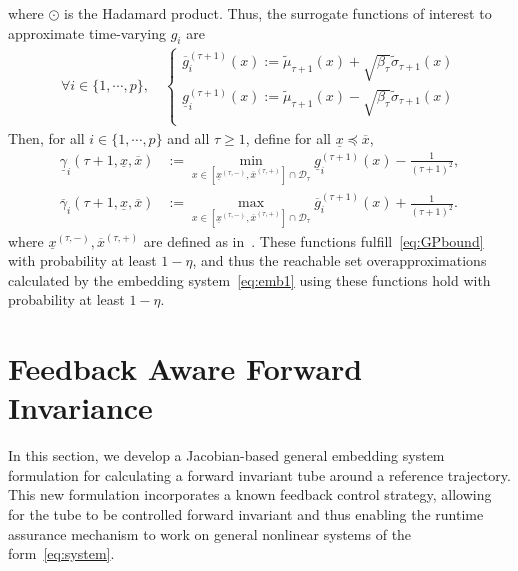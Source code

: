 \documentclass[preprint,12pt]{elsarticle}
\newcommand{\ul}{\underline}
\newcommand{\ol}{\overline}
\begin{document}
where $\odot$ is the Hadamard product. Thus, the surrogate functions of interest to approximate time-varying $g_i$ are 
\begin{align}
    \forall i\in\{1,\cdots,p\}, \quad
    \begin{cases}
    \ol{g}_{i}^{(\tau + 1)}(x) := \widetilde{\mu}_{\tau+1}(x) + \sqrt{\beta_\tau}\widetilde{\sigma}_{\tau+1}(x)\\
    \ul{g}_i^{(\tau + 1)}(x) := \widetilde{\mu}_{\tau+1}(x) - \sqrt{\beta_\tau}\widetilde{\sigma}_{\tau+1}(x)\\
    \end{cases}\label{eq:TVGP-UCB}
\end{align}
Then, for all $i\in\{1,\cdots,p\}$ and all $\tau\geq 1$, define for all $\underline{x}\preceq \overline{x}$,
\begin{align}
\underline{\gamma}_i(\tau + 1, \underline{x},\overline{x}) &:= \min_{x\in[\underline{x}^{(\tau,-)},\overline{x}^{(\tau,+)}]\cap \mathcal{D}_\tau} \underline{g}^{(\tau + 1)}_i(x)-\frac{1}{(\tau+1)^2},\label{eq:surrogate_functions2a}\\
\overline{\gamma}_i(\tau+1, \underline{x},\overline{x}) &:= \max_{x\in[\underline{x}^{(\tau,-)},\overline{x}^{(\tau,+)}]\cap \mathcal{D}_\tau} \overline{g}^{(\tau + 1)}_i(x)+\frac{1}{(\tau+1)^2}.
\label{eq:surrogate_functions2b}
\end{align}
where $\underline{x}^{(\tau,-)},\overline{x}^{(\tau,+)}$ are defined as in~\cite[Equations 54-55]{caoMMGPOJCSYS}. These functions fulfill~\eqref{eq:GPbound} with probability at least $1-\eta$, and thus the reachable set overapproximations calculated by the embedding system~\eqref{eq:emb1} using these functions hold with probability at least $1-\eta$.

\section{Feedback Aware Forward Invariance}
\label{section:finv}
In this section, we develop a Jacobian-based general embedding system formulation for calculating a forward invariant tube around a reference trajectory. This new formulation incorporates a known feedback control strategy, allowing for the tube to be controlled forward invariant and thus enabling the runtime assurance mechanism to work on general nonlinear systems of the form~\eqref{eq:system}.
\end{document}
